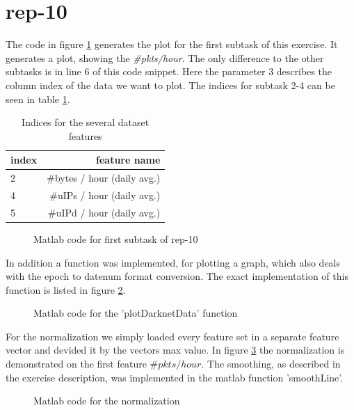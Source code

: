 \section*{rep-10}
The code in figure \ref{fig:rep10} generates the plot for the first subtask of this exercise. It generates a plot, showing the \textit{\#pkts/hour}. The only difference to the other subtasks is in line 6 of this code snippet. Here the parameter 3 describes the column index of the data we want to plot. The indices for subtask 2-4 can be seen in table \ref{tab:indices}.
\begin{table}[H]
\center
\begin{tabular}{lr}
\toprule
index & feature name \\
\midrule
2 & \#bytes / hour (daily avg.) \\
4 & \#uIPs / hour (daily avg.) \\
5 & \#uIPd / hour (daily avg.) \\
\bottomrule
\end{tabular}
\caption{Indices for the several dataset features}
\label{tab:indices}
\end{table}
\begin{figure}[H]

\caption{Matlab code for first subtask of rep-10}
\label{fig:rep10}
\end{figure}

In addition a function was implemented, for plotting a graph, which also deals with the epoch to datenum format conversion. The exact implementation of this function is listed in figure \ref{fig:plotDarkNetData}.

\begin{figure}[H]

\caption{Matlab code for the 'plotDarknetData' function}
\label{fig:plotDarkNetData}
\end{figure}

For the normalization we simply loaded every feature set in a separate feature vector and devided it by the vectors max value. In figure \ref{fig:normalization} the normalization is demonstrated on the first feature \(\#pkts/hour\). The smoothing, as described in the exercise description, was implemented in the matlab function 'smoothLine'.

\begin{figure}[H]

\caption{Matlab code for the normalization}
\label{fig:normalization}
\end{figure}



